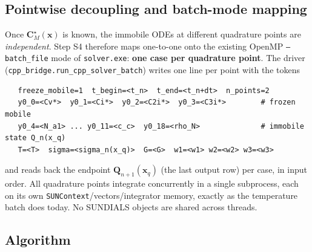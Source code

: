 \documentclass[11pt]{article}
\newcommand{\CM}{\mathbf{C}_{M}}
\newcommand{\code}[1]{\texttt{#1}}
\begin{document}
\subsection{Pointwise decoupling and batch-mode mapping}
\label{sec:opsplit_batch}

Once $\CM^\star(\mathbf x)$ is known, the immobile ODEs at different quadrature
points are \emph{independent}. Step S4 therefore maps one-to-one onto the
existing OpenMP \code{--batch\_file} mode of \code{solver.exe}: \textbf{one case
per quadrature point}. The driver (\code{cpp\_bridge.run\_cpp\_solver\_batch})
writes one line per point with the tokens
\begin{verbatim}
   freeze_mobile=1  t_begin=<t_n>  t_end=<t_n+dt>  n_points=2
   y0_0=<Cv*>  y0_1=<Ci*>  y0_2=<C2i*>  y0_3=<C3i*>        # frozen mobile
   y0_4=<N_a1> ... y0_11=<c_c>  y0_18=<rho_N>              # immobile state Q_n(x_q)
   T=<T>  sigma=<sigma_n(x_q)>  G=<G>  w1=<w1> w2=<w2> w3=<w3>
\end{verbatim}
and reads back the endpoint $\mathbf Q_{n+1}(\mathbf x_q)$ (the last output row)
per case, in input order. All quadrature points integrate concurrently in a
single subprocess, each on its own \code{SUNContext}/vectors/integrator memory,
exactly as the temperature batch does today. No SUNDIALS objects are shared
across threads.

\subsection{Algorithm}
\label{sec:opsplit_algo}
\end{document}
